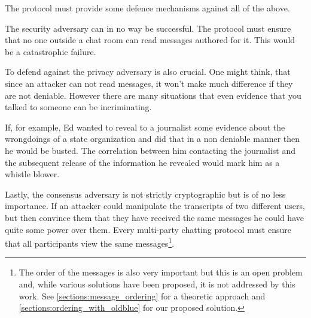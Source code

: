 The protocol must provide some defence mechanisms against all of the above.

The security adversary \secadv can in no way be successful.
The protocol must ensure that no one outside a chat room can read messages authored for it.
This would be a catastrophic failure.

To defend against the privacy adversary \privadv is also crucial.
One might think, that since an attacker can not read messages, it won't make much difference if they are not deniable.
However there are many situations that even evidence that you talked to someone can be incriminating.

If, for example, Ed wanted to reveal to a journalist some evidence about the wrongdoings of a state organization and did that in a non deniable manner then he would be busted.
The correlation between him contacting the journalist and the subsequent release of the information he revealed would mark him as a whistle blower.

Lastly, the consensus adversary \conadv is not strictly cryptographic but is of no less importance.
If an attacker could manipulate the transcripts of two different users, but then convince them that they have received the same messages he could have quite some power over them.
Every multi-party chatting protocol must ensure that all participants view the same messages\footnote{The order of the messages is also very important but this is an open problem and, while various solutions have been proposed, it is not addressed by this work. See \ref{sections:message_ordering} for a theoretic approach and \ref{sections:ordering_with_oldblue} for our proposed solution.}.
